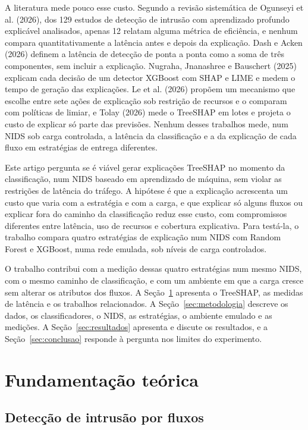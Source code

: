 \documentclass[
  article,
  12pt,
  oneside,
  a4paper,
  english,
  brazil
]{abntex2}
\begin{document}
A literatura mede pouco esse custo. Segundo a revisão sistemática de Ogunseyi et al. (2026), dos
129 estudos de detecção de intrusão com aprendizado profundo explicável analisados, apenas 12
relatam alguma métrica de eficiência, e nenhum compara quantitativamente a latência antes e depois
da explicação.
Dash e Acken (2026) definem a latência de detecção de ponta a ponta como a soma de três
componentes, sem incluir a explicação. Nugraha, Jnanashree e Bauschert (2025) explicam cada
decisão de um detector XGBoost com SHAP e LIME e medem o tempo de geração das explicações.
Le et al. (2026) propõem um mecanismo que escolhe entre sete ações de explicação sob restrição de
recursos e o comparam com políticas de limiar, e
Tolay (2026) mede o TreeSHAP em lotes e projeta o custo de explicar só parte das previsões.
Nenhum desses trabalhos mede, num NIDS sob carga controlada, a latência da classificação e a da
explicação de cada fluxo em estratégias de entrega diferentes.

Este artigo pergunta se é viável gerar explicações TreeSHAP no momento da classificação, num NIDS
baseado em aprendizado de máquina, sem violar as restrições de latência do tráfego. A hipótese é
que a explicação acrescenta um custo que varia com a estratégia e com a carga, e que explicar só
alguns fluxos ou explicar fora do caminho da classificação reduz esse custo, com compromissos
diferentes entre latência, uso de recursos e cobertura explicativa. Para testá-la, o trabalho
compara quatro estratégias de explicação num NIDS com Random Forest e XGBoost, numa rede emulada,
sob níveis de carga controlados.

O trabalho contribui com a medição dessas quatro estratégias num mesmo NIDS, com o mesmo caminho de
classificação, e com um ambiente em que a carga cresce sem alterar os atributos dos fluxos. A
Seção~\ref{sec:fundamentacao} apresenta o TreeSHAP, as medidas de latência e os trabalhos
relacionados. A Seção~\ref{sec:metodologia} descreve os dados, os classificadores, o NIDS, as
estratégias, o ambiente emulado e as medições. A Seção~\ref{sec:resultados} apresenta e discute os
resultados, e a Seção~\ref{sec:conclusao} responde à pergunta nos limites do experimento.

\section{Fundamentação teórica}
\label{sec:fundamentacao}

\subsection{Detecção de intrusão por fluxos}
\end{document}
